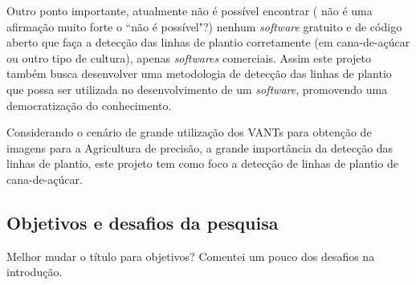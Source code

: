 \documentclass[12pt, a4paper, english, brazil]{article}
\newcommand{\textRed}[1]{{{\color{red} #1}}}
\begin{document}
Outro ponto importante, atualmente não é possível encontrar (\textRed{não é uma afirmação muito forte o ``não é possível"?}) nenhum \textit{software} gratuito e de código aberto que faça a detecção das linhas de plantio corretamente (em cana-de-açúcar ou outro tipo de cultura), apenas \textit{softwares} comerciais. Assim este projeto também busca desenvolver uma metodologia de detecção das linhas de plantio que possa ser utilizada no desenvolvimento de um \textit{software}, promovendo uma democratização do conhecimento.

Considerando o cenário de grande utilização dos VANTs para obtenção de imagens para a Agricultura de precisão, a grande importância da detecção das linhas de plantio, este projeto tem como foco a detecção de linhas de plantio de cana-de-açúcar.

 
\subsection{Objetivos e desafios da pesquisa}
\textRed{Melhor mudar o título para objetivos? Comentei um pouco dos desafios na introdução.}
\end{document}
